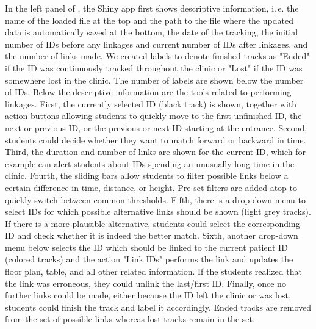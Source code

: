\documentclass[fleqn,11pt]{wlscirep_supp}
\newcommand\ie{i.\,e.\xspace}
\begin{document}
In the left panel of , the Shiny app first shows descriptive information, \ie the name of the loaded file at the top and the path to the file where the updated data is automatically saved at the bottom, the date of the tracking, the initial number of IDs before any linkages and current number of IDs after linkages, and the number of links made. We created labels to denote finished tracks as "Ended" if the ID was continuously tracked throughout the clinic or "Lost" if the ID was somewhere lost in the clinic. The number of labels are shown below the number of IDs. Below the descriptive information are the tools related to performing linkages. First, the currently selected ID (black track) is shown, together with action buttons allowing students to quickly move to the first unfinished ID, the next or previous ID, or the previous or next ID starting at the entrance. Second, students could decide whether they want to match forward or backward in time. Third, the duration and number of links are shown for the current ID, which for example can alert students about IDs spending an unusually long time in the clinic. Fourth, the sliding bars allow students to filter possible links below a certain difference in time, distance, or height. Pre-set filters are added atop to quickly switch between common thresholds. Fifth, there is a drop-down menu to select IDs for which possible alternative links should be shown (light grey tracks). If there is a more plausible alternative, students could select the corresponding ID and check whether it is indeed the better match. Sixth, another drop-down menu below selects the ID which should be linked to the current patient ID (colored tracks) and the action "Link IDs" performs the link and updates the floor plan, table, and all other related information. If the students realized that the link was erroneous, they could unlink the last/first ID. Finally, once no further links could be made, either because the ID left the clinic or was lost, students could finish the track and label it accordingly. Ended tracks are removed from the set of possible links whereas lost tracks remain in the set. 
\end{document}
